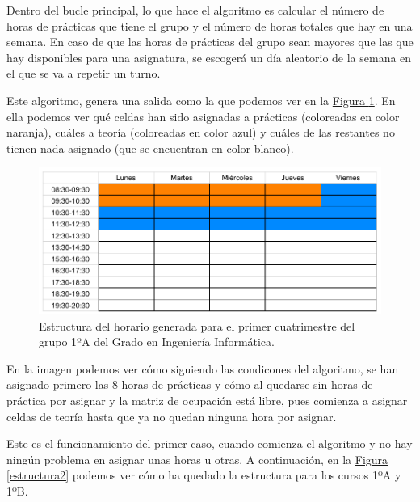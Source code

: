 Dentro del bucle principal, lo que hace el algoritmo es calcular el número de horas de prácticas que tiene el grupo y el número de horas totales que hay en una semana. En caso de que las horas de prácticas del grupo sean mayores que las que hay disponibles para una asignatura, se escogerá un día aleatorio de la semana en el que se va a repetir un turno.

Este algoritmo, genera una salida como la que podemos ver en la \hyperref[estructura1]{Figura \ref*{estructura1}}. En ella podemos ver qué celdas han sido asignadas a prácticas (coloreadas en color naranja), cuáles a teoría (coloreadas en color azul) y cuáles de las restantes no tienen nada asignado (que se encuentran en color blanco).

\begin{figure}[H]
\centering
\includegraphics[width=1\textwidth]{img/estructura1}
\caption{Estructura del horario generada para el primer cuatrimestre del grupo 1ºA del Grado en Ingeniería Informática.}
\label{estructura1}
\end{figure}

En la imagen podemos ver cómo siguiendo las condicones del algoritmo, se han asignado primero las 8 horas de prácticas y cómo al quedarse sin horas de práctica por asignar y la matriz de ocupación está libre, pues comienza a asignar celdas de teoría hasta que ya no quedan ninguna hora por asignar. 

Este es el funcionamiento del primer caso, cuando comienza el algoritmo y no hay ningún problema en asignar unas horas u otras. A continuación, en la \hyperref[estrucura2]{Figura \ref*{estructura2}} podemos ver cómo ha quedado la estructura para los cursos 1ºA y 1ºB.

